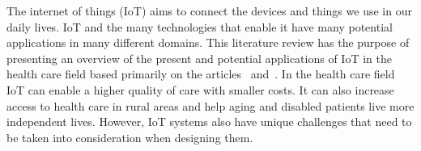 The internet of things (IoT) aims to connect the devices and things we use in
our daily lives. IoT and the many technologies that enable it have many
potential applications in many different domains. This literature review has
the purpose of presenting an overview of the present and potential applications
of IoT in the health care field based primarily on the articles~\cite{Bui2011}
and~\cite{Islam2015}. In the health care field IoT can enable a higher quality
of care with smaller costs. It can also increase access to health care in rural
areas and help aging and disabled patients live more independent lives.
However, IoT systems also have unique challenges that need to be taken into
consideration when designing them.
